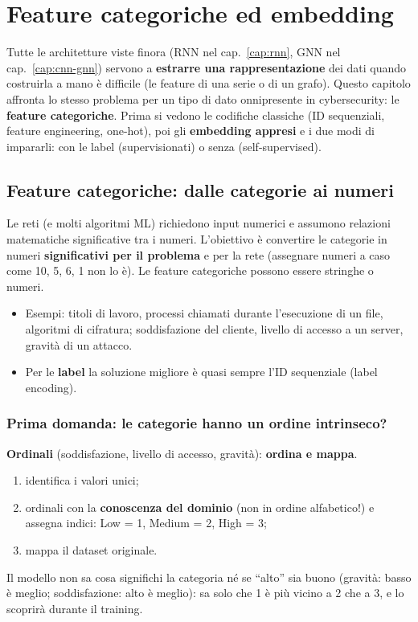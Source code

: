 \chapter{Feature categoriche ed embedding}
\label{cap:embedding}

Tutte le architetture viste finora (RNN nel cap.~\ref{cap:rnn}, GNN nel cap.~\ref{cap:cnn-gnn}) servono a \textbf{estrarre una
rappresentazione} dei dati quando costruirla a mano è difficile (le feature di una serie o di un grafo). Questo capitolo affronta lo
stesso problema per un tipo di dato onnipresente in cybersecurity: le \textbf{feature categoriche}. Prima si vedono le codifiche
classiche (ID sequenziali, feature engineering, one-hot), poi gli \textbf{embedding appresi} e i due modi di impararli: con le label
(supervisionati) o senza (self-supervised).

\section{Feature categoriche: dalle categorie ai numeri}
Le reti (e molti algoritmi ML) richiedono input numerici e assumono relazioni matematiche significative tra i numeri.
L'obiettivo è convertire le categorie in numeri \textbf{significativi per il problema} e per la rete (assegnare numeri a caso
come 10, 5, 6, 1 non lo è). Le feature categoriche possono essere stringhe o numeri.
\begin{itemize}
  \item Esempi: titoli di lavoro, processi chiamati durante l'esecuzione di un file, algoritmi di cifratura;
        soddisfazione del cliente, livello di accesso a un server, gravità di un attacco.
  \item Per le \textbf{label} la soluzione migliore è quasi sempre l'ID sequenziale (label encoding).
\end{itemize}

\subsection{Prima domanda: le categorie hanno un ordine intrinseco?}
\textbf{Ordinali} (soddisfazione, livello di accesso, gravità): \textbf{ordina e mappa}.
\begin{enumerate}
  \item identifica i valori unici;
  \item ordinali con la \textbf{conoscenza del dominio} (non in ordine alfabetico!) e assegna indici: Low = 1, Medium = 2, High = 3;
  \item mappa il dataset originale.
\end{enumerate}
Il modello non sa cosa significhi la categoria né se ``alto'' sia buono (gravità: basso è meglio; soddisfazione: alto è meglio):
sa solo che 1 è più vicino a 2 che a 3, e lo scoprirà durante il training.

